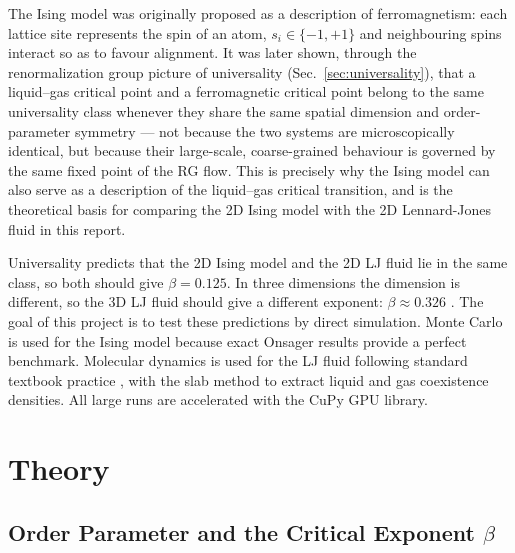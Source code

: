 \documentclass[12pt,a4paper]{article}
\begin{document}
The Ising model was originally proposed as a description of ferromagnetism: each lattice site represents the spin of an atom, $s_i \in \{-1, +1\}$
 and neighbouring spins interact so as to favour alignment. It was later shown, through the renormalization group picture of universality (Sec.~\ref{sec:universality}), that a liquid–gas critical point and a ferromagnetic critical point belong to the same universality class whenever they share the same spatial dimension and order-parameter symmetry — not because the two systems are microscopically identical, but because their large-scale, coarse-grained behaviour is governed by the same fixed point of the RG flow. This is precisely why the Ising model can also serve as a description of the liquid–gas critical transition, and is the theoretical basis for comparing the 2D Ising model with the 2D Lennard-Jones fluid in this report.

Universality predicts that the 2D Ising model and the 2D LJ fluid lie in the same class,
so both should give $\beta = 0.125$. In three dimensions the dimension is different, so
the 3D LJ fluid should give a different exponent: $\beta \approx 0.326$
\cite{pelissetto}. The goal of this project is to test these predictions by direct
simulation. Monte Carlo is used for the Ising model because exact Onsager results
\cite{onsager} provide a perfect benchmark. Molecular dynamics is used for the LJ fluid
following standard textbook practice \cite{frenkel,newman}, with the slab method to
extract liquid and gas coexistence densities. All large runs are accelerated with the
CuPy GPU library.

\section{Theory}

\subsection{Order Parameter and the Critical Exponent $\beta$}
\end{document}
